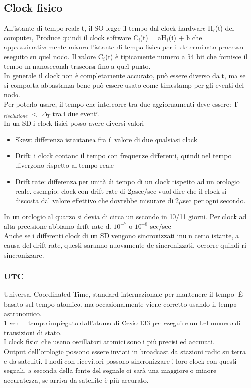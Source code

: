 \documentclass[16px]{article}
\begin{document}
\subsection{Clock fisico}
All'istante di tempo reale t, il SO legge il tempo dal clock hardware H$_i$(t) del computer, Produce quindi il clock software C$_i$(t) = aH$_i$(t) + b che approssimativamente misura l'istante di tempo fisico per il determinato processo eseguito su quel nodo. Il valore C$_i$(t) è tipicamente numero a 64 bit che fornisce il tempo in nanosecondi trascorsi fino a quel punto.\\ In generale il clock non è completamente accurato, può essere diverso da t, ma se si comporta abbastanza bene può essere usato come timestamp per gli eventi del nodo. \\ Per poterlo usare, il tempo che intercorre tra due aggiornamenti deve essere: T$_{risoluzione}$ $<$ $\Delta_T$ tra i due eventi.\\ In un SD i clock fisici posso avere diversi valori
\begin{itemize}
\item Skew: differenza istantanea fra il valore di due qualsiasi clock
\item Drift: i clock contano il tempo con frequenze differenti, quindi nel tempo divergono rispetto al tempo reale
\item Drift rate: differenza per unità di tempo di un clock rispetto ad un orologio reale. esempio: clock con drift rate di 2$\mu$sec/sec vuol dire che il clock si discosta dal valore effettivo che dovrebbe misurare di 2$\mu$sec per ogni secondo.
\end{itemize}
In un orologio al quarzo si devia di circa un secondo in 10/11 giorni. Per clock ad alta precisione abbiamo drift rate di $10^{-7}$ o  $10^{-8}$ sec/sec\\ Anche se i differenti clock di un SD vengono sincronizzati inu n certo istante, a causa del drift rate, questi saranno nuovamente de sincronizzati, occorre quindi ri sincronizzare.
\subsubsection{UTC}
Universal Coordinated Time, standard internazionale per mantenere il tempo. È basato sul tempo atomico, ma occasionalmente viene corretto usando il tempo astronomico. \\ 1 sec = tempo impiegato dall'atomo di Cesio 133 per eseguire un bel numero di transizioni di stato.\\ I clock fisici che usano oscillatori atomici sono i più precisi ed accurati. \\ Output dell'orologio possono essere inviati in broadcast da stazioni radio su terra e da satelliti. I nodi con ricevitori possono sincronizzare i loro clock con questi segnali, a seconda della fonte del segnale ci sarà una maggiore o minore accuratezza, se arriva da satellite è più accurato.
\end{document}
